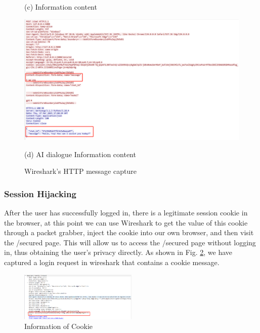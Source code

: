 \documentclass{article}
\begin{document}
\begin{figure}[H]
\begin{minipage}{0.5\textwidth}
        \caption*{(c) Information content}
    \end{minipage}
    \hfill
    \begin{minipage}{0.5\textwidth}
        \centering
        \includegraphics[width=\textwidth]{images/AI_dialogue_Information_content.png}
        \caption*{(d) AI dialogue Information content}
    \end{minipage}
    
    \caption{Wireshark's HTTP message capture}
    \label{fig:Demo Registration}
\end{figure}

\subsubsection{Session Hijacking}
After the user has successfully logged in, there is a legitimate session cookie in the browser, at this point we can use Wireshark to get the value of this cookie through a packet grabber, inject the cookie into our own browser, and then visit the /secured page. This will allow us to access the /secured page without logging in, thus obtaining the user's privacy directly. 
As shown in Fig. \ref{fig:cookie}, we have captured a login request in wireshark that contains a cookie message.

\begin{figure}[htb]
    \centering
    \includegraphics[width=0.5\textwidth]{images/Information_of_Cookie.png}
    \caption{Information of Cookie}
    \label{fig:cookie}
\end{figure}
\end{document}
